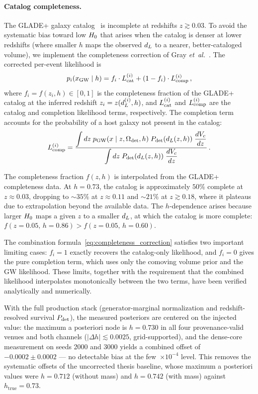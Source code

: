 \paragraph{Catalog completeness.}
The GLADE+ galaxy catalog~\cite{Dalya:2021ewn} is incomplete at redshifts
$z \gtrsim 0.03$. To avoid the systematic bias toward low $H_0$ that
arises when the catalog is denser at lower redshifts (where smaller $h$
maps the observed $d_L$ to a nearer, better-cataloged volume), we
implement the completeness correction of Gray
\emph{et~al.}~\cite{Gray:2019ksv}. The corrected per-event likelihood is
\begin{equation}
  p_i(x_\mathrm{GW} \mid h) =
    f_i \cdot L_\mathrm{cat}^{(i)}
    + (1 - f_i) \cdot L_\mathrm{comp}^{(i)} \,,
  \label{eq:completeness_correction}
\end{equation}
where $f_i = f(z_i, h) \in [0, 1]$ is the completeness fraction of the
GLADE+ catalog at the inferred redshift $z_i = z(d_L^{(i)}, h)$, and
$L_\mathrm{cat}^{(i)}$ and $L_\mathrm{comp}^{(i)}$ are the catalog and completion
likelihood terms, respectively. The completion term accounts for the
probability of a host galaxy not present in the catalog:
\begin{equation}
  L_\mathrm{comp}^{(i)} =
    \frac{\displaystyle\int dz \; p_\mathrm{GW}(x \mid z, \Omega_\mathrm{det}, h)
      \; P_\mathrm{det}(d_L(z,h)) \; \frac{dV_c}{dz}}
    {\displaystyle\int dz \; P_\mathrm{det}(d_L(z,h))
      \; \frac{dV_c}{dz}} \,.
  \label{eq:completion_term}
\end{equation}

The completeness fraction $f(z, h)$ is interpolated from the GLADE+
completeness data. At $h = 0.73$, the catalog is approximately $50\%$
complete at $z \approx 0.03$, dropping to $\sim 35\%$ at
$z \approx 0.11$ and $\sim 21\%$ at $z \gtrsim 0.18$, where it
plateaus due to extrapolation beyond the available data. The $h$-dependence
arises because larger $H_0$ maps a given $z$ to a smaller $d_L$, at which
the catalog is more complete: $f(z = 0.05,\, h = 0.86) > f(z = 0.05,\, h = 0.60)$.

The combination formula~\eqref{eq:completeness_correction} satisfies two
important limiting cases: $f_i = 1$ exactly recovers the catalog-only
likelihood, and $f_i = 0$ gives the pure completion term, which uses only
the comoving volume prior and the GW likelihood. These limits, together
with the requirement that the combined likelihood interpolates
monotonically between the two terms, have been verified analytically and
numerically.

With the full production stack (generator-marginal normalization and
redshift-resolved survival $P_\mathrm{det}$), the measured posteriors are
centered on the injected value: the maximum a posteriori node is
$h = 0.730$ in all four provenance-valid venues and both channels
($|\Delta h| \lesssim 0.0025$, grid-supported), and the dense-core
measurement on seeds 2000 and 3000 yields a combined offset of
$-0.0002 \pm 0.0002$ --- no detectable bias at the
few~$\times 10^{-4}$ level. This removes the systematic offsets of
the uncorrected thesis baseline, whose maximum a posteriori values
were $h = 0.712$ (without mass) and $h = 0.742$ (with mass) against
$h_\mathrm{true} = 0.73$.

